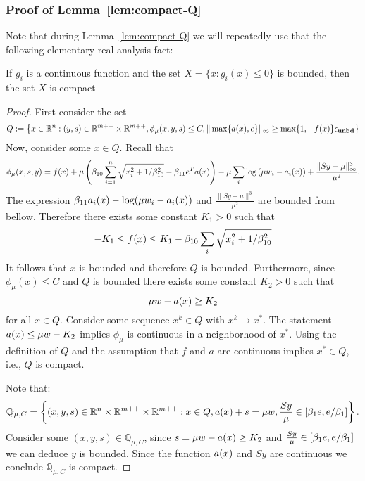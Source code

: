 \documentclass{article}
\begin{document}
\subsubsection{Proof of Lemma~\ref{lem:compact-Q}} \label{sec:lem:compact-Q}

Note that during Lemma~\ref{lem:compact-Q} we will repeatedly use that the following elementary real analysis fact: 

\begin{fact}
If $g_i$ is a continuous function and the set $X = \{ x : g_i(x) \le 0 \}$ is bounded, then the set $X$ is compact
\end{fact}

\lemCompactQ*

\begin{proof}
First consider the set
$$
Q := \left\{ x \in \mathbb{R}^{n} : (y, s) \in \mathbb{R}^{m++} \times \mathbb{R}^{m++}, \phi_{\mu}(x,y,s) \le C, \| \max\{ a(x), e \} \|_{\infty} \ge \max\{1,-f(x) \} \epsilon_{\textbf{unbd}} \right\} 
$$
Now, consider some $x \in Q$. Recall that
$$
\phi_{\mu}(x, s, y) = f(x) + \mu \left( \beta_{10} \sum_{i = 1}^{n} \sqrt{x_i^2 + 1 / \beta_{10}^2} - \beta_{11} e^T a(x) \right)  - \mu  \sum_i{ \log \left( \mu w_i - a_i(x)  \right) } + \frac{\| S y - \mu \|_{\infty}^3}{\mu^2}.
$$
The expression $\beta_{11} a_i(x) - \log(\mu w_i - a_i(x))$ and $\frac{\| S y - \mu \|^3}{\mu^2}$ are bounded from bellow. Therefore there exists some constant $K_{1} > 0$ such that
$$
-K_{1} \le f(x) \le K_{1} - \beta_{10} \sum_{i}{\sqrt{x_i^2 + 1 / \beta_{10}^2}}
$$
It follows that $x$ is bounded and therefore $Q$ is bounded. Furthermore, since $\phi_{\mu}(x) \le C$ and $Q$ is bounded there exists some constant $K_{2} > 0$ such that
$$
\mu w - a(x) \ge K_{2}
$$
for all $x \in Q$. Consider some sequence $x^{k} \in Q$ with $x^{k} \rightarrow x^{*}$. The statement $a(x) \le \mu w - K_{2}$ implies $\phi_{\mu}$ is continuous in a neighborhood of $x^{*}$. Using the definition of $Q$ and the assumption that $f$ and $a$ are continuous implies $x^{*} \in Q$, i.e., $Q$ is compact. 


Note that:
$$
\mathbb{Q}_{\mu, C} = \left\{ (x,y,s) \in \mathbb{R}^{n} \times \mathbb{R}^{m++} \times \mathbb{R}^{m++} : x \in Q, a(x) + s = \mu w, \frac{S y}{\mu} \in [\beta_{1} e, e / \beta_{1}]\right\}.
$$
Consider some $(x,y,s) \in \mathbb{Q}_{\mu, C}$, since $s = \mu w - a(x) \ge K_{2}$ and $\frac{S y}{\mu} \in [\beta_{1} e, e / \beta_{1}]$ we can deduce $y$ is bounded. Since the function $a(x)$ and $S y$ are continuous we conclude $\mathbb{Q}_{\mu, C}$ is compact.
\end{proof}
\end{document}
